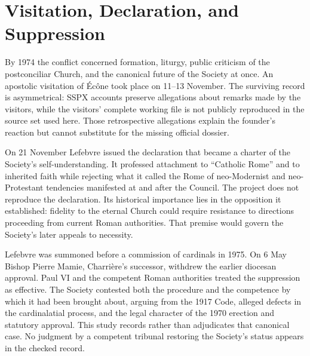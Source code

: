 \section{Visitation, Declaration, and Suppression}

By 1974 the conflict concerned formation, liturgy, public criticism of the postconciliar Church, and the canonical future of the Society at once. An apostolic visitation of Écône took place on 11--13 November. The surviving record is asymmetrical: SSPX accounts preserve allegations about remarks made by the visitors, while the visitors' complete working file is not publicly reproduced in the source set used here. Those retrospective allegations explain the founder's reaction but cannot substitute for the missing official dossier.

On 21 November Lefebvre issued the declaration that became a charter of the Society's self-understanding. It professed attachment to ``Catholic Rome'' and to inherited faith while rejecting what it called the Rome of neo-Modernist and neo-Protestant tendencies manifested at and after the Council. The project does not reproduce the declaration. Its historical importance lies in the opposition it established: fidelity to the eternal Church could require resistance to directions proceeding from current Roman authorities. That premise would govern the Society's later appeals to necessity.

Lefebvre was summoned before a commission of cardinals in 1975. On 6 May Bishop Pierre Mamie, Charrière's successor, withdrew the earlier diocesan approval. Paul VI and the competent Roman authorities treated the suppression as effective. The Society contested both the procedure and the competence by which it had been brought about, arguing from the 1917 Code, alleged defects in the cardinalatial process, and the legal character of the 1970 erection and statutory approval. This study records rather than adjudicates that canonical case. No judgment by a competent tribunal restoring the Society's status appears in the checked record.

